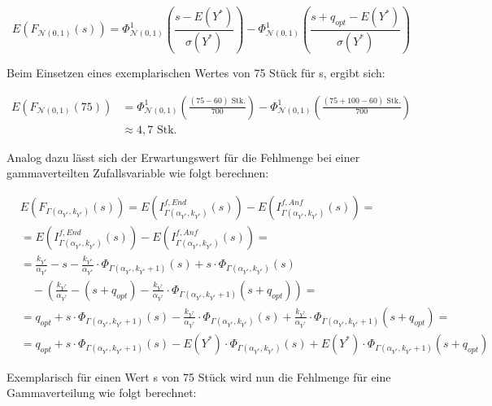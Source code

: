 \[E\left(F_{\mathcal{N}(0,1)}(s)\right)=\Phi^1_{\mathcal{N}(0,1)}\left(\frac{s-E(Y^*)}{\sigma(Y^*)}\right)-\Phi^1_{\mathcal{N}(0,1)}\left(\frac{s+q_{opt}-E(Y^*)}{\sigma(Y^*)}\right)\]

Beim Einsetzen eines exemplarischen Wertes von 75 Stück für s, ergibt sich:

\begin{align*}
E\left(F_{\mathcal{N}(0,1)}(75)\right)&=\Phi^1_{\mathcal{N}(0,1)}\left(\frac{(75-60)\text{ Stk.}}{700}\right)-\Phi^1_{\mathcal{N}(0,1)}\left(\frac{(75+100-60)\text{ Stk.}}{700}\right)\\
&\approx4,7\text{ Stk.}
\end{align*}

\pagebreak
Analog dazu lässt sich der Erwartungswert für die Fehlmenge bei einer gammaverteilten Zufallsvariable wie folgt berechnen:

\begin{align*}
&E\left(F_{\Gamma\left(\alpha_{Y^*},k_{Y^*}\right)}(s)\right)= E\left(I^{f,End}_{\Gamma\left(\alpha_{Y^*},k_{Y^*}\right)}\left(s\right)\right)-E\left(I^{f,Anf}_{\Gamma\left(\alpha_{Y^*},k_{Y^*}\right)}\left(s\right)\right) = \\
&= E\left(I^{f,End}_{\Gamma\left(\alpha_{Y^*},k_{Y^*}\right)}\left(s\right)\right)-E\left(I^{f,Anf}_{\Gamma\left(\alpha_{Y^*},k_{Y^*}\right)}\left(s\right)\right)= \\
&= \frac{k_{Y^*}}{\alpha_{Y^*}}-s-\frac{k_{Y^*}}{\alpha_{Y^*}}\cdot \Phi_{\Gamma\left(\alpha_{Y^*},k_{Y^*}+1\right)}\left(s\right)+s\cdot \Phi_{\Gamma\left(\alpha_{Y^*},k_{Y^*}\right)}\left(s\right) \\
&\quad - \left(\frac{k_{Y^*}}{\alpha_{Y^*}}-\left(s+q_{opt}\right)-\frac{k_{Y^*}}{\alpha_{Y^*}}\cdot \Phi_{\Gamma\left(\alpha_{Y^*},k_{Y^*}+1\right)}\left(s+q_{opt}\right)\right) = \\
&= q_{opt}+s \cdot \Phi_{\Gamma\left(\alpha_{Y^*},k_{Y^*}+1\right)}\left(s\right)- \frac{k_{Y^*}}{\alpha_{Y^*}} \cdot \Phi_{\Gamma\left(\alpha_{Y^*},k_{Y^*}\right)}\left(s\right) + \frac{k_{Y^*}}{\alpha_{Y^*}} \cdot \Phi_{\Gamma\left(\alpha_{Y^*},k_{Y^*}+1\right)}\left(s+q_{opt}\right)=\\
&= q_{opt}+s \cdot \Phi_{\Gamma\left(\alpha_{Y^*},k_{Y^*}+1\right)}\left(s\right)- E(Y^*) \cdot \Phi_{\Gamma\left(\alpha_{Y^*},k_{Y^*}\right)}\left(s\right) + E(Y^*) \cdot \Phi_{\Gamma\left(\alpha_{Y^*},k_{Y^*}+1\right)}\left(s+q_{opt}\right)
\end{align*}


Exemplarisch für einen Wert s von 75 Stück wird nun die Fehlmenge für eine Gammaverteilung wie folgt berechnet:

